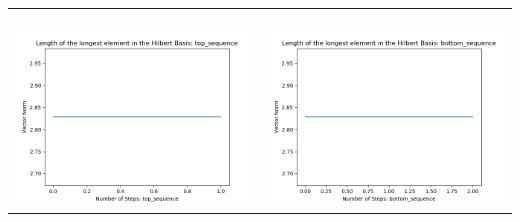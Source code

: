 \documentclass[10pt]{article}
\begin{document}
\begin{tabular}{c|c}
\begin{minipage}{.45\textwidth}
\end{minipage} \\ \\
\hline \\\begin{minipage}{.45\textwidth}
\includegraphics[width=\textwidth]{"DATA/5d/6 generators 1 bound A/top_sequence LENGTH"}
\end{minipage} &
\begin{minipage}{.45\textwidth}
\includegraphics[width=\textwidth]{"DATA/5d/6 generators 1 bound A bottomup/bottom_sequence LENGTH"}
\end{minipage}
\end{tabular}
\end{document}
